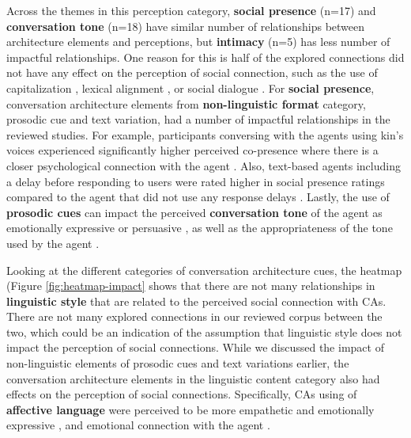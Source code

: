 \documentclass[sigconf,screen,review, anonymous]{acmart}
\newcommand{\cmt}[1]{}%
\begin{document}
Across the themes in this perception category, \textbf{social presence} (n=17) and \textbf{conversation tone} (n=18) have similar number of relationships between architecture elements and perceptions, but \textbf{intimacy} (n=5) has less number of impactful relationships. One reason for this is half of the explored connections did not have any effect on the perception of social connection, such as the use of capitalization \cite{westerman2019believe}\cmt{[9]}, lexical alignment \cite{linnemann2018can}\cmt{[15]}, or social dialogue \cite{lubold2016effects}\cmt{[86]}. For \textbf{social presence}, conversation architecture elements from \textbf{non-linguistic format} category, prosodic cue and text variation, had a number of impactful relationships in the reviewed studies. For example, participants conversing with the agents using kin's voices experienced significantly higher perceived co-presence where there is a closer psychological connection with the agent \cite{chan2021kinvoices}\cmt{[74]}. Also, text-based agents including a delay before responding to users were rated higher in social presence ratings compared to the agent that did not use any response delays \cite{gnewuch2018faster}\cmt{[19]}\cite{gnewuch2022opposing}\cmt{[20]}. Lastly, the use of \textbf{prosodic cues} can impact the perceived \textbf{conversation tone} of the agent as emotionally expressive \cite{zhu2022effects}\cmt{[26]} or persuasive \cite{chan2021kinvoices}\cmt{[74]}, as well as the appropriateness of the tone used by the agent \cite{jestin2022effects}\cmt{[81]}\cite{misu2011toward}\cmt{[83]}.

Looking at the different categories of conversation architecture cues, the heatmap (Figure \ref{fig:heatmap-impact} shows that there are not many relationships in \textbf{linguistic style} that are related to the perceived social connection with CAs. There are not many explored connections in our reviewed corpus between the two, which could be an indication of the assumption that linguistic style does not impact the perception of social connections.
While we discussed the impact of non-linguistic elements of prosodic cues and text variations earlier, the conversation architecture elements in the linguistic content category also had effects on the perception of social connections. Specifically, CAs using of \textbf{affective language} were perceived to be more empathetic \cite{daher2020empathic}\cmt{[58]}\cite{diederich2019emulating}\cmt{[25]}\cite{yang2017perceived}\cmt{[44]} and emotionally expressive \cite{zhu2022effects}\cmt{[26]}, and emotional connection with the agent \cite{lee2019s}\cmt{[55]}\cite{lubis2019positive}\cmt{[43]}.
\end{document}
